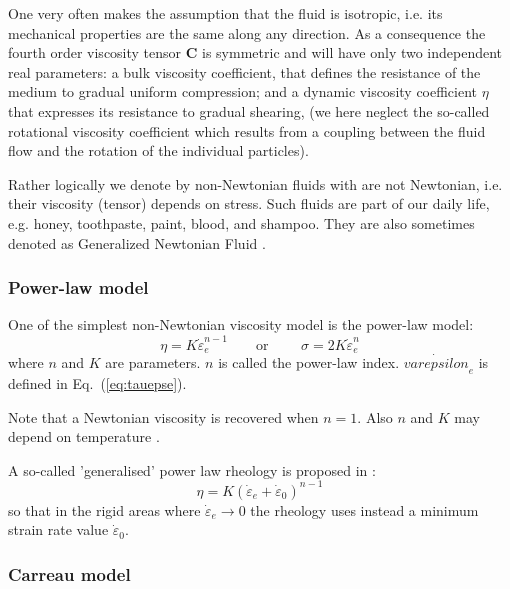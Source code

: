 One very often makes the assumption that the fluid is isotropic, i.e. its mechanical properties are the 
same along any direction. As a consequence the fourth order viscosity tensor 
${\bm C}$ is symmetric and will have only two independent real parameters: 
a bulk viscosity coefficient, that defines the resistance of the medium to gradual uniform compression; 
and a dynamic viscosity coefficient $\eta$ that expresses its resistance to gradual shearing, 
(we here neglect the so-called rotational viscosity coefficient which results from a coupling between the fluid flow and the rotation of the individual particles). %

Rather logically we denote by non-Newtonian fluids with are not Newtonian, i.e. their viscosity (tensor)
depends on stress. Such fluids are part of our daily life, e.g. honey, toothpaste, paint, blood, and shampoo.
They are also sometimes denoted as Generalized Newtonian Fluid . 
 


\subsubsection{Power-law model \label{ss:powerlaw}} 

One of the simplest non-Newtonian viscosity model is the power-law model:
\begin{equation}
\eta = K \dot{\varepsilon}_{e}^{n-1}
\qquad \text{or } \qquad
\sigma = 2 K \dot{\varepsilon}_e ^n 
\end{equation}
where $n$ and $K$ are parameters. $n$ is called the power-law index. $\dot{varepsilon}_e$ is defined in 
 Eq.~(\ref{eq:tauepse}). 

Note that a Newtonian viscosity is recovered when $n=1$. Also $n$ and $K$ may depend on temperature
\cite[p339]{reddybook2}.

A so-called 'generalised' power law rheology is proposed in \cite{iabu09}:
\begin{equation}
\eta = K (\dot{\varepsilon}_{e}+\dot{\varepsilon}_0)^{n-1}
\end{equation}
so that in the rigid areas where $\dot{\varepsilon}_e \rightarrow 0$ the rheology 
uses instead a minimum strain rate value $\dot{\varepsilon}_0$.


\Literature \cite{enmo97}

\subsubsection{Carreau model}

